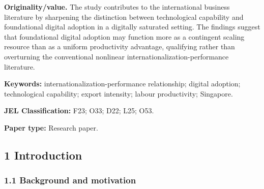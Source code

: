 \documentclass[12pt,a4paper]{article}
\begin{document}
\textbf{Originality/value.} The study contributes to the international
business literature by sharpening the distinction between technological
capability and foundational digital adoption in a digitally saturated
setting. The findings suggest that foundational digital adoption may
function more as a contingent scaling resource than as a uniform
productivity advantage, qualifying rather than overturning the
conventional nonlinear internationalization-performance literature.

\textbf{Keywords:} internationalization-performance relationship;
digital adoption; technological capability; export intensity; labour
productivity; Singapore.

\textbf{JEL Classification:} F23; O33; D22; L25; O53.

\textbf{Paper type:} Research paper.

\hypertarget{1-introduction}{%
\subsection{1 Introduction}\label{1-introduction}}

\hypertarget{11-background-and-motivation}{%
\subsubsection{1.1 Background and
motivation}\label{11-background-and-motivation}}
\end{document}
